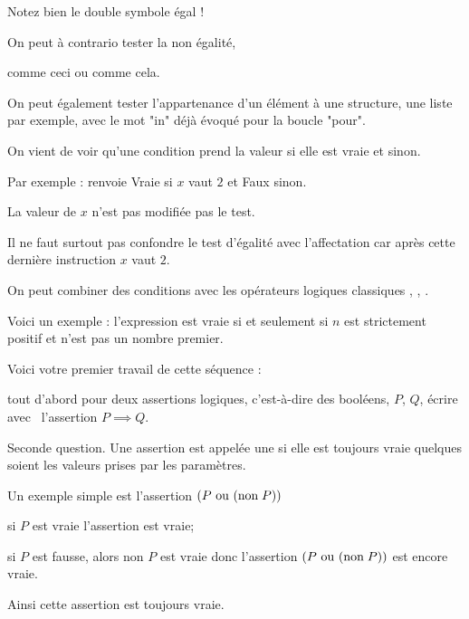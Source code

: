 Notez bien le double symbole égal !
 
\change
On peut à contrario tester la non égalité,

comme ceci ou comme cela.

\change
On peut également tester l'appartenance d'un élément à une structure, une liste par exemple, avec le mot "in" déjà évoqué pour la boucle "pour".

\diapo

\change

On vient de voir qu'une condition prend la valeur  
  si elle est vraie et  sinon.

\change  
Par exemple :  renvoie Vraie 
si $x$ vaut $2$ et Faux sinon.

La valeur de $x$ n'est pas modifiée pas le test.

\change
Il ne faut surtout pas confondre le test d'égalité
 avec l'affectation  
car après cette dernière instruction $x$ vaut $2$.
  
  
\change
On peut combiner des conditions avec les opérateurs logiques classiques
, , . 

\change
Voici un exemple :
l'expression    est vraie
si et seulement si $n$ est strictement positif et n'est pas un nombre 
premier.
  



\diapo


Voici votre premier travail de cette séquence :

tout d'abord pour deux assertions logiques, c'est-à-dire des booléens, 
$P$, $Q$, écrire avec \Sage\ l'assertion $P\implies Q$.
 
 
Seconde question. 
Une assertion est appelée une  si elle est
toujours vraie quelques soient les valeurs prises par les paramètres.

Un exemple simple est l'assertion 
$(P \text{ ou } (\text{non\;} P))$ 

si $P$ est vraie l'assertion est vraie;

si $P$ est fausse, alors non $P$ est vraie donc l'assertion
$(P \text{ ou } (\text{non\;} P))$ est encore vraie.

Ainsi cette assertion est toujours vraie.

